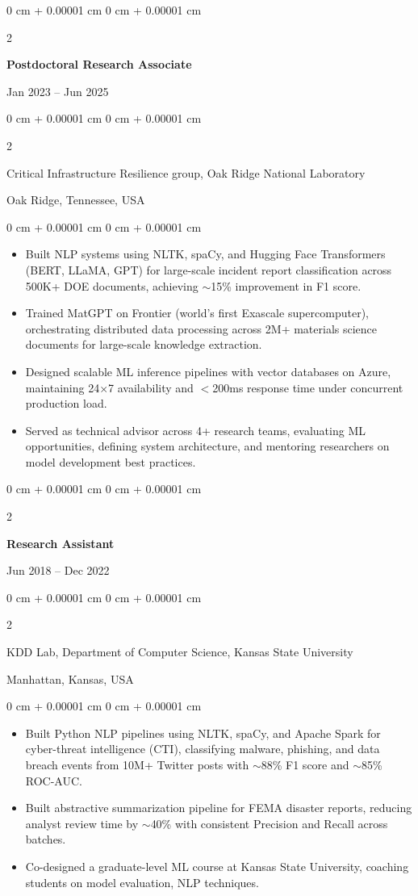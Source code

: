 \documentclass[10pt, letterpaper]{article}
\newenvironment{highlights}{
    \begin{itemize}[
        topsep=0.10 cm,
        parsep=0.10 cm,
        partopsep=0pt,
        itemsep=0pt,
        leftmargin=0 cm + 10pt
    ]
}{
    \end{itemize}
} %
\newenvironment{onecolentry}{
    \begin{adjustwidth}{
        0 cm + 0.00001 cm
    }{
        0 cm + 0.00001 cm
    }
}{
    \end{adjustwidth}
} %
\newenvironment{twocolentry}[2][]{
    \onecolentry
    \def\secondColumn{#2}
    \setcolumnwidth{\fill, 4.5 cm}
    \begin{paracol}{2}
}{
    \switchcolumn \raggedleft \secondColumn
    \end{paracol}
    \endonecolentry
} %
\begin{document}
    \begin{twocolentry}{Jan 2023 -- Jun 2025}
        \textbf{Postdoctoral Research Associate}
    \end{twocolentry}
    \begin{twocolentry}{Oak Ridge, Tennessee, USA}
        Critical Infrastructure Resilience group, Oak Ridge National Laboratory
    \end{twocolentry}
    \vspace{0.10 cm}
    \begin{onecolentry}
        \begin{highlights}
            \item Built NLP systems using NLTK, spaCy, and Hugging Face Transformers (BERT, LLaMA, GPT) for large-scale incident report classification across 500K+ DOE documents, achieving $\sim$15\% improvement in F1 score.
            \item Trained MatGPT on Frontier (world’s first Exascale supercomputer), orchestrating distributed data processing across 2M+ materials science documents for large-scale knowledge extraction.
            \item Designed scalable ML inference pipelines with vector databases on Azure, maintaining 24×7 availability and $<$200ms response time under concurrent production load.
            \item Served as technical advisor across 4+ research teams, evaluating ML opportunities, defining system architecture, and mentoring researchers on model development best practices.
        \end{highlights}
    \end{onecolentry}

    \vspace{1mm}
    
    \begin{twocolentry}{Jun 2018 -- Dec 2022}
        \textbf{Research Assistant}
    \end{twocolentry}
    \begin{twocolentry}{Manhattan, Kansas, USA}
       KDD Lab, Department of Computer Science, Kansas State University
    \end{twocolentry}
    \vspace{0.10 cm}
    \begin{onecolentry}
        \begin{highlights}
            \item Built Python NLP pipelines using NLTK, spaCy, and Apache Spark for cyber-threat intelligence (CTI), classifying malware, phishing, and data breach events from 10M+ Twitter posts with $\sim$88\% F1 score and $\sim$85\% ROC-AUC.
            \item Built abstractive summarization pipeline for FEMA disaster reports, reducing analyst review time by $\sim$40\% with consistent Precision and Recall across batches.
            \item Co-designed a graduate-level ML course at Kansas State University, coaching students on model evaluation, NLP techniques.
        \end{highlights}
    \end{onecolentry}
\end{document}
